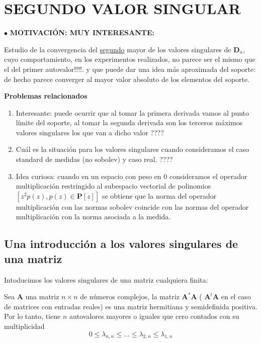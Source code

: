 \documentclass[11pt]{article}
\begin{document}
\section{SEGUNDO VALOR SINGULAR}



\noindent $\bullet$ {\bf MOTIVACIÓN:  MUY INTERESANTE:}

\noindent Estudio de la convergencia del \underline{segundo} mayor   de los valores singulares de $\mathbf{D}_n$, cuyo comportamiento, en los experimentos realizados, no parece ser  el mismo que el del primer autovalor!!!!. y que puede dar una idea más aproximada del soporte: de hecho parece converger al mayor valor absoluto de los elementos del soporte.

  {\bf Problemas relacionados}
\begin{enumerate}
  \item  Interesante: puede ocurrir que al tomar la primera derivada vamos al punto límite del soporte, al tomar la segunda derivada son los terceros máximos valores singulares los que van a dicho valor ????
  \item Cuál es la situación para los valores singulares cuando consideramos el caso standard de medidas (no sobolev) y caso real.
        ????
  \item Idea curiosa: cuando en un espacio con peso en $0$ consideramos el operador multiplicación restringido al subespacio vectorial de polinomios $[z^{2}p(z), p(z)\in \mathbf{P}[z]]$ se obtiene que la norma del operador multiplicación con las normas sobolev coincide con las normas del operador multiplicación con la norma asociada a la medida.

\end{enumerate}


\subsection{Una introducción a los valores singulares de una matriz}

\noindent Intoducimos los valores singulares de una matriz cualquiera finita:

\noindent Sea $\mathbf{A}$ una matriz $n\times n$ de números complejos,  la matriz $\mathbf{A}^{*}\mathbf{A}$  ( $\mathbf{A}^{t}\mathbf{A}$ en el caso de matrices con entradas reales) es una matriz hermitiana y semidefinida positiva. Por lo tanto, tiene $n$ autovalores mayores o iguales que cero contados con su multiplicidad
$$
  0 \leq \lambda_{n,n}\leq \dots \leq \lambda_{2,n} \leq \lambda_{1,n}
$$
\end{document}
